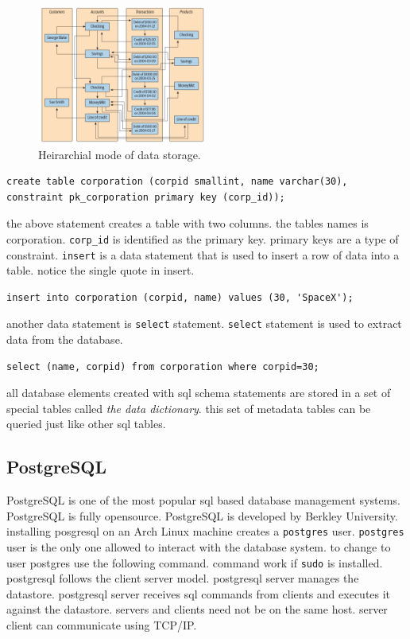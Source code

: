 \documentclass[a4paper]{article}
\begin{document}
\begin{figure}[hbt!]
    \centering
    \includegraphics[width=0.5\textwidth]{graphics/network-database.png}
    \caption{Heirarchial mode of data storage.}
\end{figure}

\begin{lstlisting}
create table corporation (corpid smallint, name varchar(30), constraint pk_corporation primary key (corp_id));
\end{lstlisting}

the above statement creates a table with two columns. the tables names is corporation. \lstinline{corp_id} is identified as the 
primary key. primary keys are a type of constraint. \lstinline{insert} is a data statement that is used to insert a row of data into
a table. notice the single quote in insert.

\begin{lstlisting}
insert into corporation (corpid, name) values (30, 'SpaceX');
\end{lstlisting}

another data statement is \lstinline{select} statement. \lstinline{select} statement is used to extract data from the database.

\begin{lstlisting}
select (name, corpid) from corporation where corpid=30;
\end{lstlisting}

all database elements created with sql schema statements are stored in a set of special tables called \emph{the data dictionary}.
this set of metadata tables can be queried just like other sql tables.

\subsection*{PostgreSQL}
\lstset{style=custom-bash}
PostgreSQL is one of the most popular sql based database management systems. PostgreSQL is fully opensource. PostgreSQL is developed 
by Berkley University. installing posgresql on  an Arch Linux machine creates a \lstinline{postgres} user. \lstinline{postgres} user 
is the only one allowed to interact with the database system. to change to user postgres use the following command. command work 
if \lstinline{sudo} is installed. postgresql follows the client server model. postgresql server manages the datastore. postgresql 
server receives sql commands from clients and executes it against the datastore. servers and clients need not be on the same host.
server client can communicate using TCP/IP.
\end{document}
